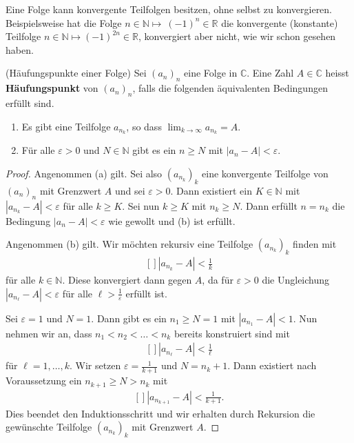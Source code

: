 \documentclass[../Analysis1_script.tex]{subfiles}
\begin{document}
Eine Folge kann konvergente Teilfolgen besitzen, ohne selbst zu konvergieren. Beispielsweise hat die Folge $n \in \mathbb {N} \mapsto \ (-1)^n \in \mathbb {R}$ die konvergente (konstante) Teilfolge $n \in \mathbb {N} \mapsto (-1)^{2n}\in \mathbb {R}$, konvergiert aber nicht, wie wir schon gesehen haben. 

\begin{proposition}{(Häufungspunkte einer Folge)}\label{prop:accum_points_of_lim}
	Sei $(a_n)_n$ eine Folge in $\mathbb {C}$. Eine Zahl $A \in \mathbb {C}$ heisst \textbf{Häufungspunkt} von $(a_n)_n$, falls die folgenden äquivalenten Bedingungen erfüllt sind.
	\begin{enumerate}
		\item Es gibt eine Teilfolge $a_{n_k}$, so dass $\lim _{k \to \infty }a_{n_k} = A$. 
		\item Für alle $\varepsilon >0$ und $N\in \mathbb {N}$ gibt es ein $n\geq N$ mit $|a_n-A|<\varepsilon$.
	\end{enumerate} 
\end{proposition}

\begin{proof}
	Angenommen (a) gilt. Sei also $(a_{n_k})_k$ eine konvergente Teilfolge von $(a_n)_n$ mit Grenzwert $A$ und sei $\varepsilon > 0$. Dann existiert ein $K\in \mathbb {N}$ mit $|a_{n_k}-A|<\varepsilon$ für alle $k \geq K$. Sei nun $k \geq K$ mit $n_k \geq N$. Dann erfüllt $n = n_k$ die Bedingung $|a_{n}-A|<\varepsilon$ wie gewollt und (b) ist erfüllt.
	
	Angenommen (b) gilt. Wir möchten rekursiv eine Teilfolge $(a_{n_k})_k$ finden mit
	\[\begin{aligned}[]
		|a_{n_k}-A| < \frac {1}{k}
	\end{aligned}\]
	für alle $k\in \mathbb {N}$. Diese konvergiert dann gegen $A$, da für $\varepsilon >0$ die Ungleichung $|a_{n_\ell }-A| < \varepsilon$ für alle $\ell > \frac {1}{\varepsilon }$ erfüllt ist.
	
	Sei $\varepsilon = 1$ und $N=1$. Dann gibt es ein $n_1 \geq N=1$ mit $|a_{n_1}-A|<1$. Nun nehmen wir an, dass $n_1<n_2 < \ldots <n_k$ bereits konstruiert sind mit
	\[\begin{aligned}[]
		|a_{n_\ell }-A| < \frac {1}{\ell }
	\end{aligned}\]
	für $\ell =1, \ldots , k$. Wir setzen $\varepsilon = \frac {1}{k+1}$ und $N = n_k+1$. Dann existiert nach Voraussetzung ein $n_{k+1} \geq N > n_k$ mit
	\[\begin{aligned}[]
		|a_{n_{k+1}}-A| < \frac {1}{k+1}.
	\end{aligned}\] 
	Dies beendet den Induktionsschritt und wir erhalten durch Rekursion die gewünschte Teilfolge $(a_{n_k})_k$ mit Grenzwert $A$. 
\end{proof}
\end{document}
